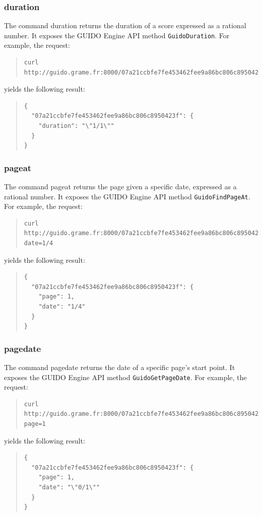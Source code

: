 \documentclass[a4paper]{article}
\begin{document}
\subsubsection{duration}
The command duration returns the duration of a score expressed as a rational number.  It exposes the GUIDO Engine API method \verb=GuidoDuration=.  For example, the request:
\begin{quote}
\begingroup
\fontsize{7.5pt}{12pt}\selectfont
\begin{verbatim}
curl http://guido.grame.fr:8000/07a21ccbfe7fe453462fee9a86bc806c8950423f/duration
\end{verbatim}
\endgroup
\end{quote}
yields the following result:
\begin{quote}
\begin{verbatim}
{
  "07a21ccbfe7fe453462fee9a86bc806c8950423f": {
    "duration": "\"1/1\""
  }
}
\end{verbatim}
\end{quote}

\subsubsection{pageat}
The command pageat returns the page given a specific date, expressed as a rational number.  It exposes the GUIDO Engine API method \verb=GuidoFindPageAt=.  For example, the request:
\begin{quote}
\begingroup
\fontsize{7.5pt}{12pt}\selectfont
\begin{verbatim}
curl http://guido.grame.fr:8000/07a21ccbfe7fe453462fee9a86bc806c8950423f/pageat?date=1/4
\end{verbatim}
\endgroup
\end{quote}
yields the following result:
\begin{quote}
\begin{verbatim}
{
  "07a21ccbfe7fe453462fee9a86bc806c8950423f": {
    "page": 1,
    "date": "1/4"
  }
}
\end{verbatim}
\end{quote}

\subsubsection{pagedate}
The command pagedate returns the date of a specific page's start point.  It exposes the GUIDO Engine API method \verb=GuidoGetPageDate=.  For example, the request:
\begin{quote}
\begingroup
\fontsize{7.5pt}{12pt}\selectfont
\begin{verbatim}
curl http://guido.grame.fr:8000/07a21ccbfe7fe453462fee9a86bc806c8950423f/pagedate?page=1
\end{verbatim}
\endgroup
\end{quote}
yields the following result:
\begin{quote}
\begin{verbatim}
{
  "07a21ccbfe7fe453462fee9a86bc806c8950423f": {
    "page": 1,
    "date": "\"0/1\""
  }
}
\end{verbatim}
\end{quote}
\end{document}
